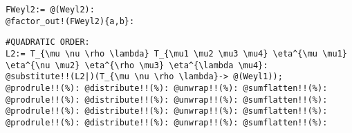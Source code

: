 \documentclass[11pt]{article}
\begin{document}
{\color[named]{Blue}\begin{verbatim}
FWeyl2:= @(Weyl2):
@factor_out!(FWeyl2){a,b}:
\end{verbatim}}
{\color[named]{Blue}\begin{verbatim}
#QUADRATIC ORDER:
L2:= T_{\mu \nu \rho \lambda} T_{\mu1 \mu2 \mu3 \mu4} \eta^{\mu \mu1} \eta^{\nu \mu2} \eta^{\rho \mu3} \eta^{\lambda \mu4}:
@substitute!!(L2|)(T_{\mu \nu \rho \lambda}-> @(Weyl1));
@prodrule!!(%): @distribute!!(%): @unwrap!!(%): @sumflatten!!(%):
@prodrule!!(%): @distribute!!(%): @unwrap!!(%): @sumflatten!!(%):
@prodrule!!(%): @distribute!!(%): @unwrap!!(%): @sumflatten!!(%):
@prodrule!!(%): @distribute!!(%): @unwrap!!(%): @sumflatten!!(%):
\end{verbatim}}
\end{document}
